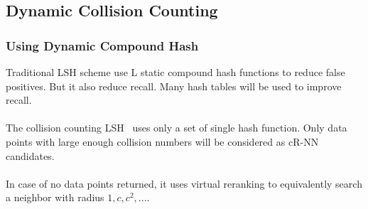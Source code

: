 \subsection{Dynamic Collision Counting}
\begin{frame}
\frametitle{Using Dynamic Compound Hash}
Traditional LSH scheme use L static compound hash functions to reduce false positives.
But it also reduce recall. Many hash tables will be used to improve recall.
~\\~\\

The collision counting LSH~\cite{gan2012locality} uses only a set of single hash function.
Only data points with large enough collision numbers will be considered as cR-NN candidates.
~\\~\\

In case of no data points returned, it uses virtual reranking to equivalently search a neighbor with radius $1, c, c^2, ...$.
\end{frame}
